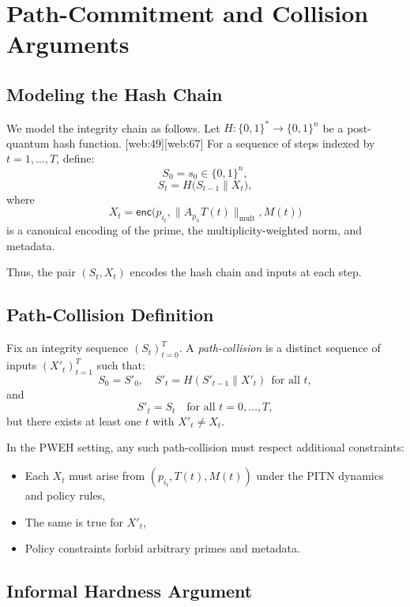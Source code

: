 \documentclass[11pt]{article}
\begin{document}
\section{Path-Commitment and Collision Arguments}

\subsection{Modeling the Hash Chain}

We model the integrity chain as follows.
Let \(H : \{0,1\}^* \to \{0,1\}^n\) be a post-quantum hash function. [web:49][web:67]
For a sequence of steps indexed by \(t=1,\dots,T\), define:
\[
  S_0 = s_0 \in \{0,1\}^n,
\]
\[
  S_t = H\big(S_{t-1} \parallel X_t\big),
\]
where
\[
  X_t = \mathsf{enc}\big(p_{i_t}, \|A_{p_{i_t}}T(t)\|_{\mathrm{mult}}, M(t)\big)
\]
is a canonical encoding of the prime, the multiplicity-weighted norm, and metadata.

Thus, the pair \((S_t,X_t)\) encodes the hash chain and inputs at each step.

\subsection{Path-Collision Definition}

\begin{definition}
Fix an integrity sequence \((S_t)_{t=0}^T\).
A \emph{path-collision} is a distinct sequence of inputs \((X'_t)_{t=1}^T\) such that:
\[
  S_0 = S'_0,\quad S'_t = H(S'_{t-1} \parallel X'_t)\ \ \text{for all }t,
\]
and
\[
  S'_t = S_t \quad\text{for all }t=0,\dots,T,
\]
but there exists at least one \(t\) with \(X'_t \neq X_t\).
\end{definition}

In the PWEH setting, any such path-collision must respect additional constraints:
\begin{itemize}[leftmargin=1.5em]
  \item Each \(X_t\) must arise from \((p_{i_t},T(t),M(t))\) under the PITN dynamics and policy rules,
  \item The same is true for \(X'_t\),
  \item Policy constraints forbid arbitrary primes and metadata.
\end{itemize}

\subsection{Informal Hardness Argument}
\end{document}
